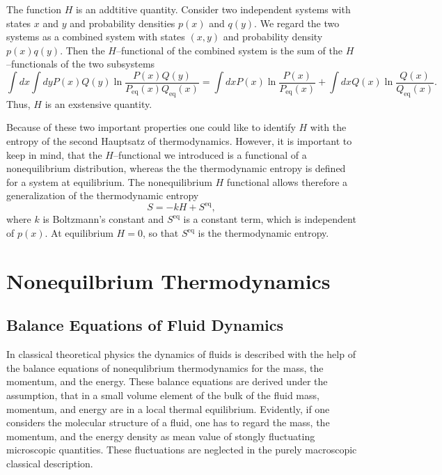 The function $H$ is an addtitive quantity. Consider two independent systems
with states $x$ and $y$ and probability densities $p(x)$ and $q(y)$. We regard
the two systems as a combined system with states $(x,y)$ and probability
density $p(x)q(y)$. Then the $H$--functional of the combined system is the sum
of the $H$--functionals of the two subsystems
\begin{displaymath}
  \int dx \int dy P(x) Q(y) \ln \frac{P(x) Q(y)}
                                     {P_{\textrm{eq}}(x) Q_{\textrm{eq}}(x)}=
\int dx P(x)  \ln \frac{P(x)}{P_{\textrm{eq}}(x)}  +
\int dx Q(x)  \ln \frac{Q(x)}{Q_{\textrm{eq}}(x)}.
\end{displaymath}
Thus, $H$ is an exstensive quantity.
 
Because of these two important properties one could like  to  identify $H$
with the entropy
of the second Hauptsatz of thermodynamics. However, it is important to keep in
mind, that the $H$--functional we introduced is a functional of a
nonequilibrium distribution, whereas the the thermodynamic entropy is defined
for a  system at equilibrium. The nonequilibrium $H$ functional allows 
therefore a  generalization of the thermodynamic entropy
\begin{displaymath}
  S = -k H + S^{\textrm{eq}},
\end{displaymath}
where $k$ is Boltzmann's constant and $S^{\textrm{eq}}$ is a constant term,
which is independent of $p(x)$. At equilibrium $H=0$, so that 
$S^{\textrm{eq}}$ is the thermodynamic entropy.


\section{Nonequilbrium Thermodynamics}
\subsection{Balance Equations of Fluid Dynamics}
In classical theoretical physics the dynamics of fluids is described with the
help of the balance equations of nonequlibrium thermodynamics for the mass,
the momentum, and the energy. These balance equations are derived under the
assumption, that in a small volume element of the bulk of the fluid mass,
momentum, and energy are in a local thermal equilibrium. Evidently, if one
considers the molecular structure of a fluid, one has to regard the mass, the
momentum, and the energy density as mean value of stongly fluctuating
microscopic quantities. These fluctuations are neglected in the purely
macroscopic classical description. 

